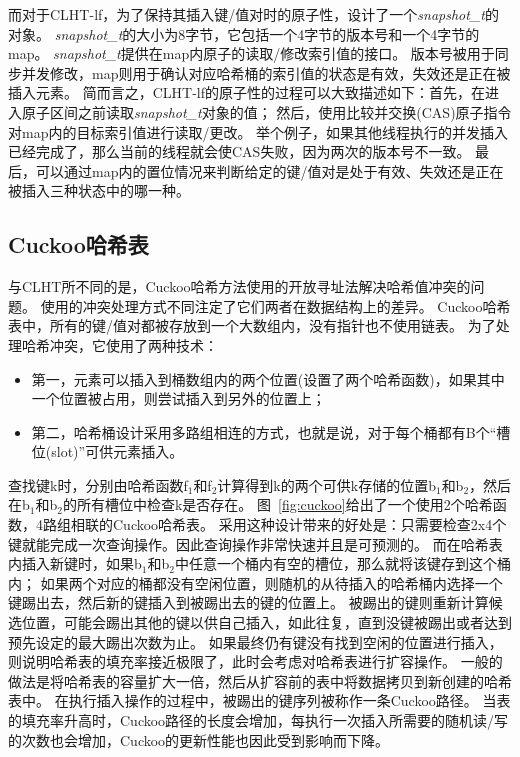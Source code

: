 而对于CLHT-lf，为了保持其插入键/值对时的原子性，设计了一个\textit{snapshot\_t}的对象。
\textit{snapshot\_t}的大小为8字节，它包括一个4字节的版本号和一个4字节的map。
\textit{snapshot\_t}提供在map内原子的读取/修改索引值的接口。
版本号被用于同步并发修改，map则用于确认对应哈希桶的索引值的状态是有效，失效还是正在被插入元素。
简而言之，CLHT-lf的原子性的过程可以大致描述如下：首先，在进入原子区间之前读取\textit{snapshot\_t}对象的值；
然后，使用比较并交换(CAS)原子指令对map内的目标索引值进行读取/更改。
举个例子，如果其他线程执行的并发插入已经完成了，那么当前的线程就会使CAS失败，因为两次的版本号不一致。
最后，可以通过map内的置位情况来判断给定的键/值对是处于有效、失效还是正在被插入三种状态中的哪一种。

\subsection{Cuckoo哈希表}
\label{sec:ckhash}
与CLHT所不同的是，Cuckoo哈希方法使用的开放寻址法解决哈希值冲突的问题。
使用的冲突处理方式不同注定了它们两者在数据结构上的差异。
Cuckoo哈希表中，所有的键/值对都被存放到一个大数组内，没有指针也不使用链表。
为了处理哈希冲突，它使用了两种技术：
\begin{itemize}
\item 第一，元素可以插入到桶数组内的两个位置(设置了两个哈希函数)，如果其中一个位置被占用，则尝试插入到另外的位置上；
\item 第二，哈希桶设计采用多路组相连的方式，也就是说，对于每个桶都有B个“槽位(slot)”可供元素插入。
\end{itemize}

查找键k时，分别由哈希函数f$_1$和f$_2$计算得到k的两个可供k存储的位置b$_1$和b$_2$，然后在b$_1$和b$_2$的所有槽位中检查k是否存在。
图~\ref{fig:cuckoo}给出了一个使用2个哈希函数，4路组相联的Cuckoo哈希表。
采用这种设计带来的好处是：只需要检查2x4个键就能完成一次查询操作。因此查询操作非常快速并且是可预测的。
而在哈希表内插入新键时，如果b$_1$和b$_2$中任意一个桶内有空的槽位，那么就将该键存到这个桶内；
如果两个对应的桶都没有空闲位置，则随机的从待插入的哈希桶内选择一个键踢出去，然后新的键插入到被踢出去的键的位置上。
被踢出的键则重新计算候选位置，可能会踢出其他的键以供自己插入，如此往复，直到没键被踢出或者达到预先设定的最大踢出次数为止。
如果最终仍有键没有找到空闲的位置进行插入，则说明哈希表的填充率接近极限了，此时会考虑对哈希表进行扩容操作。
一般的做法是将哈希表的容量扩大一倍，然后从扩容前的表中将数据拷贝到新创建的哈希表中。
在执行插入操作的过程中，被踢出的键序列被称作一条Cuckoo路径。
当表的填充率升高时，Cuckoo路径的长度会增加，每执行一次插入所需要的随机读/写的次数也会增加，Cuckoo的更新性能也因此受到影响而下降。

